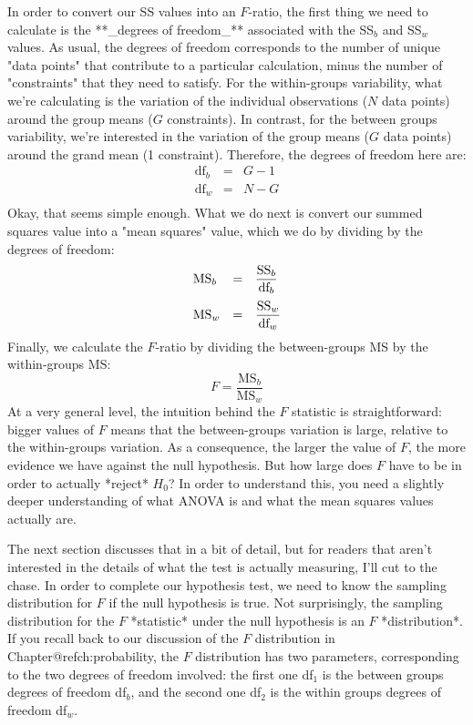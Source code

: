 In order to convert our SS values into an $F$-ratio, the first thing we need to calculate is the **_degrees of freedom_** associated with the SS$_b$ and SS$_w$ values. As usual, the degrees of freedom corresponds to the number of unique "data points" that contribute to a particular calculation, minus the number of "constraints" that they need to satisfy. For the within-groups variability, what we're calculating is the variation of the individual observations ($N$ data points) around the group means ($G$ constraints). In contrast, for the between groups variability, we're interested in the variation of the group means ($G$ data points) around the grand mean (1 constraint). Therefore, the degrees of freedom here are:
$$
\begin{array}{lcl}
\mbox{df}_b &=& G-1 \\
\mbox{df}_w &=& N-G \\
\end{array}
$$
Okay, that seems simple enough. What we do next is convert our summed squares value into a "mean squares" value, which we do by dividing by the degrees of freedom: 
$$
\begin{array}{lcl}
\mbox{MS}_b &=& \displaystyle\frac{\mbox{SS}_b }{ \mbox{df}_b} \vspace*{6pt} \\
\mbox{MS}_w &=& \displaystyle\frac{\mbox{SS}_w }{ \mbox{df}_w} 
\end{array}
$$
Finally, we calculate the $F$-ratio by dividing the between-groups MS by the within-groups MS:
$$
F = \frac{\mbox{MS}_b }{ \mbox{MS}_w } 
$$
At a very general level, the intuition behind the $F$ statistic is straightforward: bigger values of $F$ means that the between-groups variation is large, relative to the within-groups variation. As a consequence, the larger the value of $F$, the more evidence we have against the null hypothesis. But how large does $F$ have to be in order to actually *reject* $H_0$? In order to understand this, you need a slightly deeper understanding of what ANOVA is and what the mean squares values actually are. 

The next section discusses that in a bit of detail, but for readers that aren't interested in the details of what the test is actually measuring, I'll cut to the chase. In order to complete our hypothesis test, we need to know the sampling distribution for $F$ if the null hypothesis is true. Not surprisingly, the sampling distribution for the $F$ *statistic* under the null hypothesis is an $F$ *distribution*. If you recall back to our discussion of the $F$ distribution in Chapter@refch:probability, the $F$ distribution has two parameters, corresponding to the two degrees of freedom involved: the first one df$_1$ is the between groups degrees of freedom df$_b$, and the second one df$_2$ is the within groups degrees of freedom df$_w$. 

